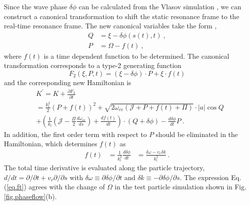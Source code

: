 Since the wave phase $\delta \phi$ can be calculated from the Vlasov simulation
 \cite{zheng2024}, we can construct a canonical transformation to shift the static resonance frame to the real-time resonance frame.
The new canonical variables take the form \cite{berk1999},
\begin{equation}
    \begin{aligned}
        Q &= \xi - \delta \phi(s(t),t)~,
        \\
        P & = \Omega - f(t)~,
    \end{aligned}
\end{equation}
where $f(t)$ is a time dependent function to be determined.
The canonical  transformation corresponds to a type-2 generating function
\begin{equation}
    F_2(\xi,P,t) = (\xi - \delta \phi) \cdot P + \xi \cdot f(t)
\end{equation}
and the corresponding new Hamiltonian  is
\begin{equation}
    \begin{aligned}
        &  K^\prime = K + \frac{\partial F_2}{\partial t}
        \\
        & = \frac{k_l^2}{2}(P+f(t))^2 
        + \sqrt{2\omega_{ce}(\mathcal{J}+P+f(t)+\Pi)} \cdot |a|\cos Q 
        \\
        & + \left(\frac{1}{k_l}\left(\mathcal{J} - \frac{\Pi}{2} \frac{d\omega_{ce}}{ds}\right)  +\frac{d f(t)}{d t} \right)\cdot(Q + \delta \phi)  - \frac{d \delta \phi}{d t} P ~. 
        \end{aligned}
\end{equation}
In addition,  the first order term with respect to $P$  should be eliminated in the  Hamiltonian, which determines $f(t)$ as
\begin{equation}\label{eq.ft}
    \begin{aligned}
    f(t) & = \frac{1}{k_l^2} \frac{d \delta \phi}{d t}  &= \frac{\delta \omega - v_r \delta k}{k_l^2}~.
    \end{aligned}
\end{equation} 
The total time derivative is evaluated along the particle trajectory, $d/dt = \partial/\partial t + v_r \partial /\partial s$ with $\delta \omega  \equiv \partial \delta \phi/\partial t$ and $\delta k  \equiv -\partial \delta \phi/\partial s$.
The expression Eq. (\ref{eq.ft}) agrees with the change of $\Omega$ in the test particle simulation shown in Fig. \ref{fig.phaseflow}(b).
